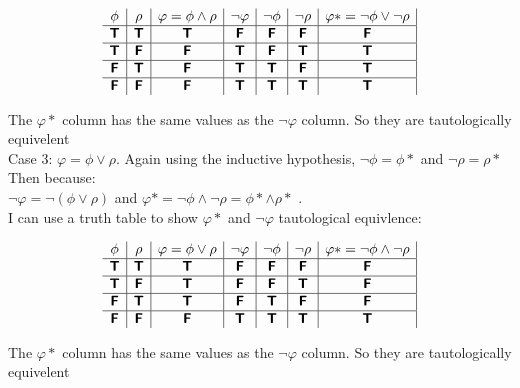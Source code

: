 \documentclass[11pt,leqno,fleqn]{article}
\begin{document}
\[
\begin{array}{ c | c | c | c | c | c | c | c | c }
 \phi & \rho & \varphi = \phi \land \rho &  \neg{\varphi} & \neg{\phi} & \neg{\rho}&\varphi * = \neg{\phi} \lor \neg{\rho} 
\\ \hline 
 \bm{\mathsf{T}} & \bm{\mathsf{T}} & \bm{\mathsf{T}} & \bm{\mathsf{F}} & \bm{\mathsf{F}}  & \bm{\mathsf{F}} & \bm{\mathsf{F}}
\\ \hline  
 \bm{\mathsf{T}} & \bm{\mathsf{F}} &  \bm{\mathsf{F}} & \bm{\mathsf{T}}  & \bm{\mathsf{F}} & \bm{\mathsf{T}} & \bm{\mathsf{T}}
 \\ \hline  
 \bm{\mathsf{F}} & \bm{\mathsf{T}} & \bm{\mathsf{F}} & \bm{\mathsf{T}} & \bm{\mathsf{T}} & \bm{\mathsf{F}} & \bm{\mathsf{T}}
 \\ \hline  
 \bm{\mathsf{F}} & \bm{\mathsf{F}} & \bm{\mathsf{F}}  & \bm{\mathsf{T}}  & \bm{\mathsf{T}} &  \bm{\mathsf{T}} & \bm{\mathsf{T}}
\end{array}
\]

The $\varphi * $ column has the same values as the $\neg{\varphi}$ column. So they are tautologically equivelent \\

Case 3: $\varphi = \phi \lor \rho$. Again  using the inductive hypothesis, $\neg{\phi} = \phi *$ and $\neg{\rho} = \rho *$\\
Then because:\\
$ \neg{\varphi}  = \neg{(\phi \lor \rho)}$ and $\varphi * =  \neg{\phi} \land \neg{\rho}  =  \phi * \land \rho* $ . \\
I can use a truth table to show $\varphi *$ and $ \neg{\varphi}$ tautological equivlence: 

\[
\begin{array}{ c | c | c | c | c | c | c | c | c }
 \phi & \rho & \varphi = \phi \lor \rho &  \neg{\varphi} & \neg{\phi} & \neg{\rho}&\varphi * = \neg{\phi} \land \neg{\rho} 
\\ \hline 
 \bm{\mathsf{T}} & \bm{\mathsf{T}} & \bm{\mathsf{T}} & \bm{\mathsf{F}} & \bm{\mathsf{F}}  & \bm{\mathsf{F}} & \bm{\mathsf{F}}
\\ \hline  
 \bm{\mathsf{T}} & \bm{\mathsf{F}} &  \bm{\mathsf{T}} & \bm{\mathsf{F}}  & \bm{\mathsf{F}} & \bm{\mathsf{T}} & \bm{\mathsf{F}}
 \\ \hline  
 \bm{\mathsf{F}} & \bm{\mathsf{T}} & \bm{\mathsf{T}} & \bm{\mathsf{F}} & \bm{\mathsf{T}} & \bm{\mathsf{F}} & \bm{\mathsf{F}}
 \\ \hline  
 \bm{\mathsf{F}} & \bm{\mathsf{F}} & \bm{\mathsf{F}}  & \bm{\mathsf{T}}  & \bm{\mathsf{T}} &  \bm{\mathsf{T}} & \bm{\mathsf{T}}
\end{array}
\]

The $\varphi * $ column has the same values as the $\neg{\varphi}$ column. So they are tautologically equivelent \\
\end{document}

